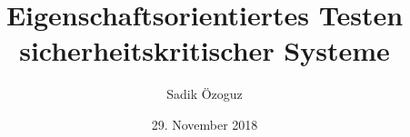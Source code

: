 \documentclass[10pt]{beamer}
\title{Eigenschaftsorientiertes Testen sicherheitskritischer Systeme}
\author{Sadik Özoguz}
\institute{Universit{\"a}t Bremen}
\date[29.11.2018]{29. November 2018}
\begin{document}
\begin{frame}
  \titlepage
\end{frame}

\begin{frame}
  \tableofcontents
\end{frame}










\end{document}
